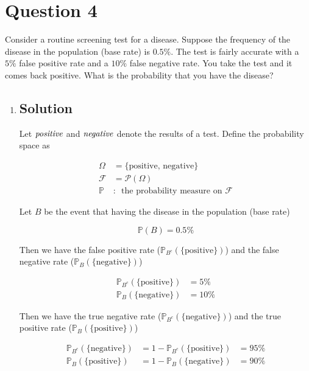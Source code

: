 \documentclass[12pt]{article}
\newcommand{\bP}{\mathbb{P}}
\begin{document}
	
	\section*{Question 4}
	
	\noindent Consider a routine screening test for a disease. Suppose the frequency of the disease in the population (base rate) is $0.5\%$. The test is fairly accurate with a $5\%$ false positive rate and a $10\%$ false negative rate. You take the test and it comes back positive. What is the probability that you have the disease?
	
	\bigskip
	
	\begin{enumerate}[label={},leftmargin=0in]\item
		
		\subsection*{Solution}
		
			Let $\it{positive}$ and $\it{negative}$ denote the results of a test. Define the probability space as
			
			\[
			\begin{aligned}
				\Omega &= \{\mathrm{positive},\,\mathrm{negative}\}\\
				\mathcal{F} &= \mathcal{P}(\Omega)\\
				\bP &:\enspace \text{the probability measure on $\mathcal{F}$}
			\end{aligned}
			\]
			
			Let $B$ be the event that having the disease in the population (base rate)
			
			\[\bP(B) = 0.5\%\]
			
			Then we have the false positive rate ($\bP_{B^c}(\{\mathrm{positive}\})$) and the false negative rate ($\bP_B(\{\mathrm{negative}\})$)
			
			\[
			\begin{aligned}
				\bP_{B^c}(\{\mathrm{positive}\}) &= 5\%\\
				\bP_B(\{\mathrm{negative}\}) &= 10\%
			\end{aligned}
			\]
			
			Then we have the true negative rate ($\bP_{B^c}(\{\mathrm{negative}\})$) and the true positive rate ($\bP_B(\{\mathrm{positive}\})$)
			
			\[
			\begin{aligned}
				\bP_{B^c}(\{\mathrm{negative}\}) &= 1-\bP_{B^c}(\{\mathrm{positive}\}) &= 95\%\\
				\bP_B(\{\mathrm{positive}\}) &= 1-\bP_B(\{\mathrm{negative}\}) &= 90\%
			\end{aligned}
			\]
			

\end{enumerate}
\end{document}
